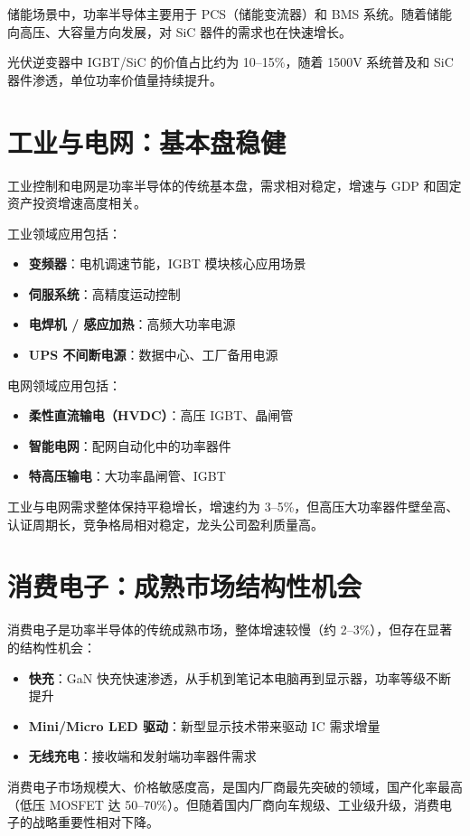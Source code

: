 储能场景中，功率半导体主要用于 PCS（储能变流器）和 BMS 系统。随着储能向高压、大容量方向发展，对 SiC 器件的需求也在快速增长。

光伏逆变器中 IGBT/SiC 的价值占比约为 10–15\%，随着 1500V 系统普及和 SiC 器件渗透，单位功率价值量持续提升。

\section{工业与电网：基本盘稳健}

工业控制和电网是功率半导体的传统基本盘，需求相对稳定，增速与 GDP 和固定资产投资增速高度相关。

\vspace{0.3em}

工业领域应用包括：
\begin{itemize}[leftmargin=2em]
\item \textbf{变频器}：电机调速节能，IGBT 模块核心应用场景
\item \textbf{伺服系统}：高精度运动控制
\item \textbf{电焊机 / 感应加热}：高频大功率电源
\item \textbf{UPS 不间断电源}：数据中心、工厂备用电源
\end{itemize}

电网领域应用包括：
\begin{itemize}[leftmargin=2em]
\item \textbf{柔性直流输电（HVDC）}：高压 IGBT、晶闸管
\item \textbf{智能电网}：配网自动化中的功率器件
\item \textbf{特高压输电}：大功率晶闸管、IGBT
\end{itemize}

工业与电网需求整体保持平稳增长，增速约为 3–5\%，但高压大功率器件壁垒高、认证周期长，竞争格局相对稳定，龙头公司盈利质量高。

\section{消费电子：成熟市场结构性机会}

消费电子是功率半导体的传统成熟市场，整体增速较慢（约 2–3\%），但存在显著的结构性机会：

\begin{itemize}[leftmargin=2em]
\item \textbf{快充}：GaN 快充快速渗透，从手机到笔记本电脑再到显示器，功率等级不断提升
\item \textbf{Mini/Micro LED 驱动}：新型显示技术带来驱动 IC 需求增量
\item \textbf{无线充电}：接收端和发射端功率器件需求
\end{itemize}

消费电子市场规模大、价格敏感度高，是国内厂商最先突破的领域，国产化率最高（低压 MOSFET 达 50–70\%）。但随着国内厂商向车规级、工业级升级，消费电子的战略重要性相对下降。
